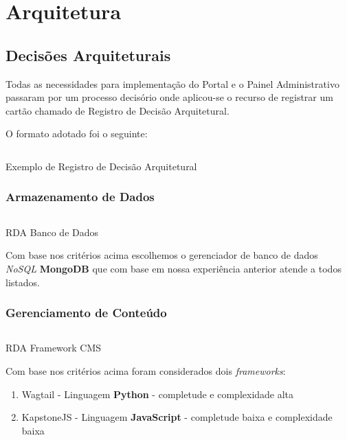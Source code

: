 \section{Arquitetura}\label{RS0000:arquitetura}

\subsection{Decisões Arquiteturais}

Todas as necessidades para implementação do Portal e o Painel Administrativo passaram por um processo decisório onde aplicou-se o recurso de registrar um cartão chamado de Registro de Decisão Arquitetural\cite{kopp2018markdown}.

O formato adotado foi o seguinte:

\begin{code}
    \inputminted[label=rda]{text}{../RS0000/anexos/exemplo.rda}
    \caption{Exemplo de Registro de Decisão Arquitetural}\label{RS0000:code:exemplo-rda}
\end{code}

\subsubsection{Armazenamento de Dados}

\begin{code}
    \inputminted[label=Armazenamento de Dados]{text}{../RS0000/anexos/db.rda}
    \caption{RDA Banco de Dados}\label{RS0000:code:db-rda}
\end{code}

Com base nos critérios acima escolhemos o gerenciador de banco de dados \textit{NoSQL} \textbf{MongoDB} que com base em nossa experiência anterior atende a todos listados.

\subsubsection{Gerenciamento de Conteúdo}

\begin{code}
    \inputminted[label=Gerenciamento de Conteúdo]{text}{../RS0000/anexos/framework.rda}
    \caption{RDA Framework CMS}\label{RS0000:code:framework-rda}
\end{code}

Com base nos critérios acima foram considerados dois \textit{frameworks}:

\begin{enumerate}
    \item Wagtail - Linguagem \textbf{Python} - completude e complexidade alta
    \item KapstoneJS - Linguagem \textbf{JavaScript} - completude baixa e complexidade baixa
\end{enumerate}

